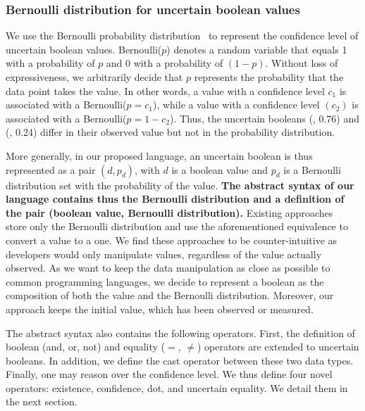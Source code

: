 \subsubsection{Bernoulli distribution for uncertain boolean values}
We use the Bernoulli probability distribution~\cite{walck1996hand} to represent the confidence level of uncertain boolean values.
Bernoulli($p$) denotes a random variable that equals 1 with a probability of $p$ and 0 with a probability of $(1 - p)$.
Without loss of expressiveness, we arbitrarily decide that $p$ represents the probability that the data point takes the \true{} value.
In other words, a \true{} value with a confidence level $c_1$ is associated with a Bernoulli($p = c_1$), while a \false{} value with a confidence level $(c_2)$ is associated with a Bernoulli($p = 1 - c_2$).
Thus, the uncertain booleans (\true{}, 0.76) and (\false{}, 0.24) differ in their observed value but not in the probability distribution.

More generally, in our proposed language, an uncertain boolean is thus represented as a pair $(d, p_d)$, with $d$ is a boolean value and $p_d$ is a Bernoulli distribution set with the probability of the \true{} value.
\textbf{The abstract syntax of our language contains thus the Bernoulli distribution and a definition of the pair (boolean value, Bernoulli distribution).}
Existing approaches~\cite{DBLP:conf/ecmdafa/BertoaMBBTV18} store only the Bernoulli distribution and use the aforementioned equivalence to convert a \false{} value to a \true{} one. 
We find these approaches to be counter-intuitive as developers would only manipulate \true{} values, regardless of the value actually observed.
As we want to keep the data manipulation as close as possible to common programming languages, we decide to represent a boolean as the composition of both the value and the Bernoulli distribution.
Moreover, our approach keeps the initial value, which has been observed or measured.

The abstract syntax also contains the following operators.
First, the definition of boolean (and, or, not) and equality ($=$, $\ne$) operators are extended to uncertain booleans.
In addition, we define the cast operator between these two data types.
Finally, one may reason over the confidence level.
We thus define four novel operators: existence, confidence, dot, and uncertain equality.
We detail them in the next section.

